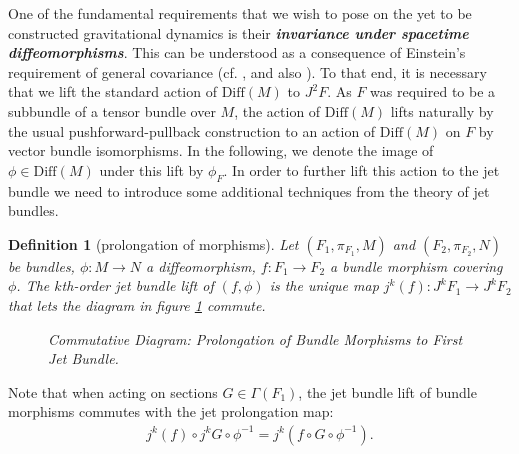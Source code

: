\documentclass[%
 reprint,
nofootinbib,
 amsmath,amssymb,
 aps,
 prd,
floatfix,
]{revtex4-2}
\newtheorem{definition}{Definition}
\begin{document}
One of the fundamental requirements that we wish to pose on the yet to be constructed gravitational dynamics is their \textit{\textbf{invariance under spacetime diffeomorphisms}}. 
This can be understood as a consequence of Einstein's requirement of general covariance (cf. \cite{Stachel1993-STATMO-5}, \cite{Pooley} and also \cite{Norton1993-NORGCA}).
To that end, it is necessary that we lift the standard action of $\mathrm{Diff}(M)$ to $J^2F$.
As $F$ was required to be a subbundle of a tensor bundle over $M$, the action of $\mathrm{Diff}(M)$ lifts naturally by the usual pushforward-pullback construction to an action of $\mathrm{Diff}(M)$ on $F$ by vector bundle isomorphisms.
In the following, we denote the image of $\phi \in \mathrm{Diff}(M)$ under this lift by $\phi_F$.
In order to further lift this action to the jet bundle we need to introduce some additional techniques from the theory of jet bundles.
\begin{definition}[prolongation of morphisms]
Let $(F_1,\pi_{F_1},M)$ and $(F_2,\pi_{F_2},N)$ be bundles, $\phi : M \rightarrow N$ a diffeomorphism, $f : F_1 \rightarrow F_2$ a bundle morphism covering $\phi$. The $k$th-order jet bundle lift of $(f,\phi)$ is the unique  map $j^k(f):J^kF_1 \rightarrow J^kF_2$ that lets the diagram in figure \ref{ProlongMorph} commute.
\begin{figure}[hbt!]
\centering
{}
\caption{Commutative Diagram: Prolongation of Bundle Morphisms to First Jet Bundle.}\label{ProlongMorph}
\end{figure}
\end{definition}
Note that when acting on sections $G \in \Gamma(F_1)$, the jet bundle lift of bundle morphisms commutes with the jet prolongation map:
\begin{align}
j^k(f) \circ j^kG \circ \phi^{-1} = j^k \left (
f \circ G \circ \phi^{-1} \right ).
\end{align}
\end{document}
